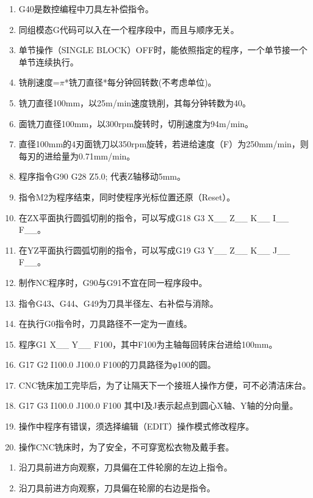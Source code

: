 \documentclass[12pt,twocolumn,landscape,UTF8,twoside]{ctexart}
\begin{document}
\begin{spacing}{1}
\begin{enumerate} [1、]
\item G40是数控编程中刀具左补偿指令。
\item 同组模态G代码可以入在一个程序段中，而且与顺序无关。
\item 单节操作（SINGLE BLOCK）OFF时，能依照指定的程序，一个单节接一个单节连续执行。
\item 铣削速度=$\pi$*铣刀直径*每分钟回转数(不考虑单位)。
\item 铣刀直径100mm，以25m/min速度铣削，其每分钟转数为40。
\item 面铣刀直径100mm，以300rpm旋转时，切削速度为94m/min。
\item 直径100mm的4刃面铣刀以350rpm旋转，若进给速度（F）为250mm/min，则每刃的进给量为0.71mm/min。
\item 程序指令G90 G28 Z5.0; 代表Z轴移动5mm。
\item 指令M2为程序结束，同时使程序光标位置还原（Reset）。
\item 在ZX平面执行圆弧切削的指令，可以写成G18 G3 X\_\_ Z\_\_ K\_\_ I\_\_ F\_\_。
\item 在YZ平面执行圆弧切削的指令，可以写成G19 G3 Y\_\_ Z\_\_ K\_\_ J\_\_ F\_\_。
\item 制作NC程序时，G90与G91不宜在同一程序段中。
\item 指令G43、G44、G49为刀具半径左、右补偿与消除。
\item 在执行G0指令时，刀具路径不一定为一直线。
\item 程序G1 X\_\_ Y\_\_ F100，其中F100为主轴每回转床台进给100mm。
\item G17 G2 I100.0 J100.0 F100的刀具路径为φ100的圆。
\item CNC铣床加工完毕后，为了让隔天下一个接班人操作方便，可不必清洁床台。
\item G17 G3 I100.0 J100.0 F100 其中I及J表示起点到圆心X轴、Y轴的分向量。
\item 操作中程序有错误，须选择编辑（EDIT）操作模式修改程序。
\item 操作CNC铣床时，为了安全，不可穿宽松衣物及戴手套。
\end{enumerate}
\begin{enumerate} [1.]
\item 沿刀具前进方向观察，刀具偏在工件轮廓的左边上指令。
\item 沿刀具前进方向观察，刀具偏在轮廓的右边是指令。

\end{enumerate}
\end{spacing}
\end{document}
